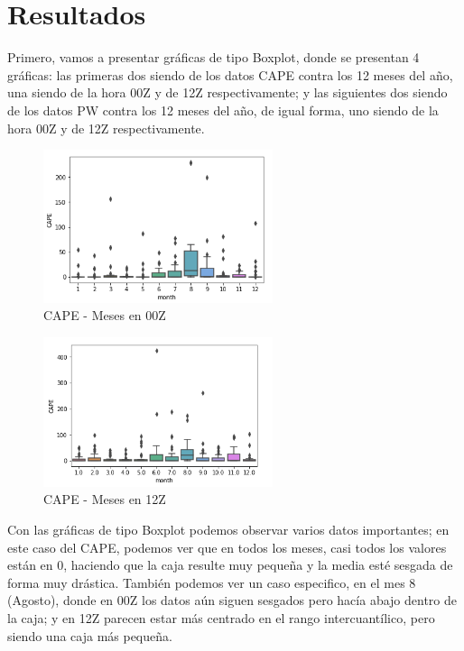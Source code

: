 \documentclass[a4paper]{article}
\begin{document}
\pagebreak
\section{Resultados}

Primero, vamos a presentar gráficas de tipo Boxplot, donde se presentan 4 gráficas: las primeras dos siendo de los datos CAPE contra los 12 meses del año, una siendo de la hora 00Z y de 12Z respectivamente; y las siguientes dos siendo de los datos PW contra los 12 meses del año, de igual forma, uno siendo de la hora 00Z y de 12Z respectivamente.

\begin{figure}[ht!]
 \centering
  \includegraphics[width=0.6\textwidth]{00Z_Boxplot_CAPE.png}
  \caption{CAPE - Meses en 00Z}
\end{figure}
\begin{figure}[ht!]
 \centering
  \includegraphics[width=0.6\textwidth]{12Z_Boxplot_CAPE.png}
  \caption{CAPE - Meses en 12Z}
\end{figure}

Con las gráficas de tipo Boxplot podemos observar varios datos importantes; en este caso del CAPE, podemos ver que en todos los meses, casi todos los valores están en 0, haciendo que la caja resulte muy pequeña y la media esté sesgada de forma muy drástica. También podemos ver un caso especifico, en el mes 8 (Agosto), donde en 00Z los datos aún siguen sesgados pero hacía abajo dentro de la caja; y en 12Z parecen estar más centrado en el rango intercuantílico, pero siendo una caja más pequeña.
\end{document}
